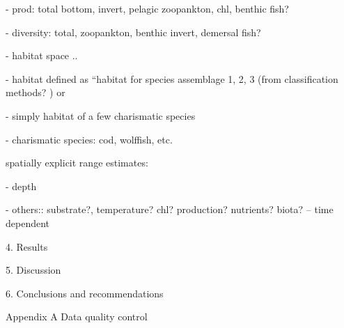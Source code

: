 \documentclass[letterpaper,portrait,12pt]{scrartcl}
\numberwithin{equation}{section}		%
\numberwithin{figure}{section}			%
\numberwithin{table}{section}				%
\begin{document}
- prod: total bottom, invert, pelagic zoopankton, chl, benthic fish?




- diversity: total, zoopankton, benthic invert, demersal fish?




- habitat space ..




- habitat defined as {``}habitat for species assemblage 1, 2, 3 (from classification methods? ) or




- simply habitat of a few charismatic species




- charismatic species: cod, wolffish, etc.



\begin{flushleft}

	spatially explicit range estimates:

\end{flushleft}



- depth




- others:: substrate?, temperature? chl? production? nutrients? biota? -- time dependent









4. Results









5. Discussion









6. Conclusions and recommendations
























Appendix A  Data quality control
\end{document}
